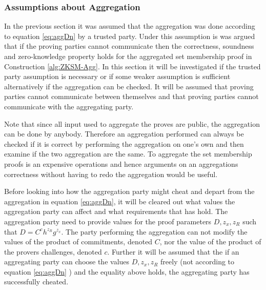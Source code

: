 \subsubsection*{Assumptions about Aggregation}
In the previous section it was assumed that the aggregation was done according to equation \eqref{eq:aggDn} by a trusted party. Under this assumption is was argued that if the proving parties cannot communicate then the correctness, soundness and zero-knowledge property holds for the aggregated set membership proof in Construction \ref{alg:ZKSM-Agg}. In this section it will be investigated if the trusted party assumption is necessary or if some weaker assumption is sufficient alternatively if the aggregation can be checked. It will be assumed that proving parties cannot communicate between themselves and that proving parties cannot communicate with the aggregating party. 

Note that since all input used to aggregate the proves are public, the aggregation can be done by anybody. Therefore an aggregation performed can always be checked if it is correct by performing the aggregation on one's own and then examine if the two aggregation are the same. To aggregate the set membership proofs is an expensive operations and hence arguments on an aggregations correctness without having to redo the aggregation would be useful.

Before looking into how the aggregation party might cheat and depart from the aggregation in equation \eqref{eq:aggDn}, it will be cleared out what values the aggregation party can affect and what requirements that has hold. The aggregation party need to provide values for the proof parameters $D,z_x,z_R$ such that $D=C^ch^{z_R}g^{z_x}$. The party performing the aggregation can not modify the values of the product of commitments, denoted $C$, nor the value of the product of the provers challenges, denoted $c$. Further it will be assumed that the if an  aggregating party can choose the values $D,z_x,z_R$ freely (not according to equation \eqref{eq:aggDn} ) and the equality above holds, the aggregating party has successfully cheated. 


